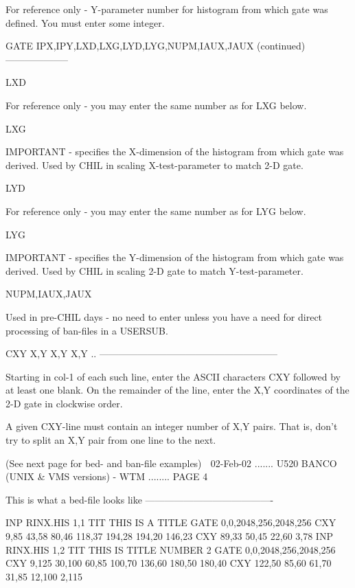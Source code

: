    For reference only - Y-parameter number for histogram from which  gate  was
   defined. You must enter some integer.
 
   GATE IPX,IPY,LXD,LXG,LYD,LYG,NUPM,IAUX,JAUX (continued)--------------------
 
   LXD
 
   For reference only - you may enter the same number as for LXG below.
 
   LXG
 
   IMPORTANT  - specifies the X-dimension of the histogram from which gate was
   derived. Used by CHIL in scaling X-test-parameter to match 2-D gate.
 
   LYD
 
   For reference only - you may enter the same number as for LYG below.
 
   LYG
 
   IMPORTANT - specifies the Y-dimension of the histogram from which gate  was
   derived. Used by CHIL in scaling 2-D gate to match Y-test-parameter.
 
   NUPM,IAUX,JAUX
 
   Used  in pre-CHIL days - no need to enter unless you have a need for direct
   processing of ban-files in a USERSUB.
 
   CXY X,Y X,Y X,Y .. --------------------------------------------------------
 
   Starting in col-1 of  each  such  line,  enter  the  ASCII  characters  CXY
   followed  by  at  least  one blank. On the remainder of the line, enter the
   X,Y coordinates of the 2-D gate in clockwise order.
 
   A given CXY-line must contain an integer number  of  X,Y  pairs.  That  is,
   don't try to split an X,Y pair from one line to the next.
 
 
                 (See next page for bed- and ban-file examples)
    
   02-Feb-02 ....... U520  BANCO (UNIX & VMS versions) - WTM ........ PAGE   4
 
 
 
   This is what a bed-file looks like ----------------------------------------
 
   INP RINX.HIS  1,1
   TIT THIS IS A TITLE
   GATE 0,0,2048,256,2048,256
   CXY 9,85 43,58 80,46 118,37 194,28 194,20 146,23
   CXY 89,33 50,45 22,60 3,78
   INP RINX.HIS  1,2
   TIT THIS IS TITLE NUMBER 2
   GATE 0,0,2048,256,2048,256
   CXY 9,125 30,100 60,85 100,70 136,60 180,50 180,40
   CXY 122,50 85,60 61,70 31,85 12,100 2,115
 
